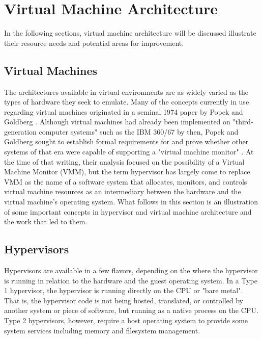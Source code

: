 
\section{Virtual Machine Architecture}
\label{sec:vmarchitecture}
In the following sections, virtual machine architecture will be discussed illustrate their resource needs and potential areas for improvement.

\subsection{Virtual Machines}
\label{sec:virtualmachines}
The architectures available in virtual environments are as widely varied as the types of hardware they seek to emulate.
Many of the concepts currently in use regarding virtual machines originated in a seminal 1974 paper by Popek and Goldberg \autocite{_popek_1}.
Although virtual machines had already been implemented on "third-generation computer systems" such as the IBM 360/67 by then, Popek and Goldberg sought to establish formal requirements for and prove whether other systems of that era were capable of supporting a "virtual machine monitor" \autocite{_popek_1}.
At the time of that writing, their analysis focused on the possibility of a Virtual Machine Monitor (VMM), but the term hypervisor has largely come to replace VMM as the name of a software system that allocates, monitors, and controls virtual machine resources as an intermediary between the hardware and the virtual machine's operating system.
What follows in this section is an illustration of some important concepts in hypervisor and virtual machine architecture and the work that led to them.

\subsection{Hypervisors}
\label{sec:hypervisors}
Hypervisors are available in a few flavors, depending on the where the hypervisor is running in relation to the hardware and the guest operating system.
In a Type 1 hypervisor, the hypervisor is running directly on the CPU or "bare metal".
That is, the hypervisor code is not being hosted, translated, or controlled by another system or piece of software, but running as a native process on the CPU.
Type 2 hypervisors, however, require a host operating system to provide some system services including memory and filesystem management.

